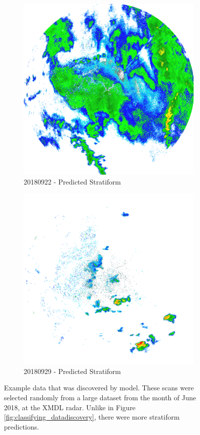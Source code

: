 \begin{figure}[h]
\begin{subfigure}[b]{0.45\textwidth}
		\includegraphics[width=\textwidth]{./thesis_code/plots/midlothian-tx-20180922-105742-ref.png}
		\caption{20180922 - Predicted Stratiform}
		\label{fig:classifying_datadiscovery_ex7}
	\end{subfigure}
	\begin{subfigure}[b]{0.45\textwidth}
		\includegraphics[width=\textwidth]{./thesis_code/plots/midlothian-tx-20180929-202320-ref.png}
		\caption{20180929 - Predicted Stratiform}
		\label{fig:classifying_datadiscovery_ex8}
	\end{subfigure}
	\caption{Example data that was discovered by model. These scans were selected randomly from a large dataset from the month of June 2018, at the XMDL radar. Unlike in Figure \ref{fig:classifying_datadiscovery}, there were more stratiform predictions.}
	\label{fig:classifying_datadiscovery_201809}
\end{figure}
